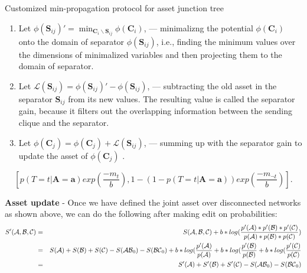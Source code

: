 \documentclass[onecolumn]{article}
\begin{document}
\begin{table}
\label{tab:mpprotocol}
\caption{Customized min-propagation protocol for asset junction tree}
\small
\hrulefill
\begin{enumerate}
  \item Let ${\phi(\mathbf{S}_{ij})}' =  \min_{\mathbf{C}_i \backslash
  \mathbf{S}_{ij}} \phi(\mathbf{C}_i)$, ---  minimalizng the
  potential $\phi(\mathbf{C}_i)$ onto the domain of  separator
  $\phi(\mathbf{S}_{ij})$, i.e., finding the minimum values over the dimensions of minimalized variables and then projecting them to the domain of separator.
  \item Let $\mathcal{L}(\mathbf{S}_{ij}) = {{\phi(\mathbf{S}_{ij})}'} -  {\phi(\mathbf{S}_{ij})}$,  --- subtracting the old asset in the separator $\mathbf{S}_{ij}$ from its new values. The resulting value is called the separator gain, because it filters out the overlapping information between the sending clique and the separator. 
  \item Let $\phi(\mathbf{C}_j) = \phi(\mathbf{C}_j) + \mathcal{L}
  (\mathbf{S}_{ij})$, --- summing up with the separator gain to update the asset of $\phi(\mathbf{C}_j)$ .
\end{enumerate}
\hrulefill
\end{table}

\begin{equation}
  \label{eqn:editlimits}
  \left[ {p(T=t|\mathbf{A=a})}exp(\frac{-m_t}{b}), 1- (1-p(T=t|\mathbf{A=a}))exp(\frac{-m_{\neg t}}{b}) \right] . 
\end{equation}

\textbf{Asset update} - Once we have defined the joint asset over disconnected networks as shown above, we can do the following after making edit on probabilities:
\begin{eqnarray}
    S'({\cal{A,B,C}}) &=& S({\cal{A,B,C}}) + b * log(\frac{p'({\cal{A}})*p'({\cal{B}})*p'({\cal{C)}}}{p({\cal{A}})*p({\cal{B}})*p({\cal{C)}}}) \nonumber \\
                   &=& S({\cal{A}})+ S({\cal{B}}) + S({\cal{C}}) - S({\cal{AB}}_0) - S({\cal{BC}}_0) + b*log(\frac{p'({\cal{A}})}{p({\cal{A}})} + b*log(\frac{p'({\cal{B}})}{p({\cal{B}})} + b*log(\frac{p'({\cal{C}})}{p({\cal{C}})} \nonumber \\
                   &=& S'({\cal{A}})+ S'({\cal{B}}) + S'({\cal{C}}) - S({\cal{AB}}_0) - S({\cal{BC}}_0)
\end{eqnarray}
\end{document}
